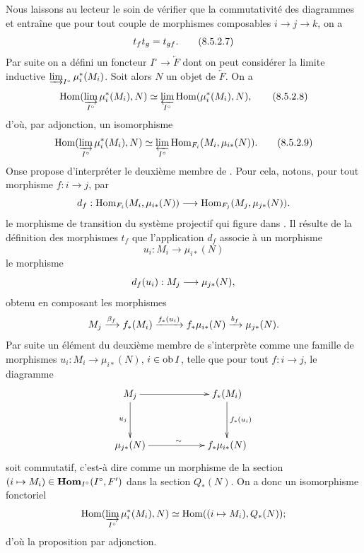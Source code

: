 \documentclass[10pt]{../fichiers-configuration-latex/smfart}
\begin{document}
Nous laissons au lecteur le soin de vérifier que la commutativité des
diagrammes  et 
entraîne que pour tout couple de
morphismes composables $i \to j \to k$, on a
\begin{equation*}
t_f t_g = t_{gf}{}.\tag{8.5.2.7}
\end{equation*}
Par suite on a défini un foncteur $I^{\circ} \to \underleftarrow{F}$
dont on peut
considérer la limite inductive $\varinjlim_{I^{\circ}}
\mu^{\ast}_i (M_i)$. Soit alors $N$ un objet de $\underleftarrow{F}$. On a
\begin{equation*}
\operatorname{Hom}(\varinjlim_{I^{\circ}} \mu^{\ast}_i (M_i), N) \simeq
\varprojlim_{I^{\circ}} \operatorname{Hom} (\mu^{\ast}_i (M_i), N){},\tag{8.5.2.8}
\end{equation*}
d'où, par adjonction, un isomorphisme
\begin{equation*}
\operatorname{Hom}(\varinjlim_{I^{\circ}} \mu^{\ast}_i (M_i), N) \simeq
\varprojlim_{I^{\circ}} \operatorname{Hom}_{F_i} (M_i, \mu_{i \ast} (N)){}.\tag{8.5.2.9}
\end{equation*}
On\pageoriginale se propose d'interpréter le deuxième membre de
. Pour cela, notons, pour tout morphisme $f : i \to
j$, par
$$
d_f : \Hom_{F_i}(M_i, \mu_{i\ast}(N)) \to \Hom_{F_j} (M_j,
\mu_{j\ast} (N)){\quoi}.
$$
le morphisme de transition du système projectif qui figure dans
. Il résulte de la définition des morphismes $t_f$ 
que l'application $d_f$ associe à un morphisme
$$
u_i : M_i \to \mu_{i\ast}(N)
$$
le morphisme
$$
d_f(u_i) : M_{j} \to \mu_{j\ast}(N){\quoi},
$$
obtenu en composant les morphismes
$$
M_j \xrightarrow{\beta_f} f_{\ast}(M_i) \xrightarrow{f_{\ast} (u_i)}
f_{\ast} \mu_{i\ast} (N) \xrightarrow{b_f} \mu_{j\ast} (N){}.
$$
Par suite un élément du deuxième membre de  s'interprète
comme une famille de morphismes $u_i : M_{i} \to \mu_{i\ast} (N)$, $i
\in \operatorname{ob} I$, telle que pour tout $f : i \to j$, le diagramme
\[
\xymatrix@C=2cm@R=1.25cm{
M_j  \ar[r] \ar[d]_{u_j}& f_{\ast}(M_i) \ar[d]^{f_{\ast}(u_i)}\\
\mu_{j\ast}(N)  \ar[r]^{\sim} & f_{\ast}\mu_{i\ast}(N)
}
\]
soit commutatif, c'est-à dire comme un morphisme de la section $(i
\mapsto M_i) \in \operatorname{\mathbf{Hom}}_{I^{\circ}} (I^{\circ}, F')$ dans la
section $Q_{\ast}(N)$. On a donc un isomorphisme fonctoriel
$$
\operatorname{Hom}(\varinjlim_{I^{\circ}} \mu_i^{\ast} (M_i), N)
\simeq \operatorname{Hom}((i \mapsto M_i), Q_{\ast}(N)){};
$$
d'où la proposition par adjonction.
\end{document}
